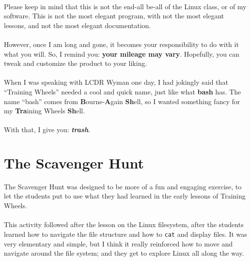 \documentclass[11pt]{article}
\begin{document}
	\paragraph{} Please keep in mind that this is not the end-all be-all of the Linux class, or of my software. This is not the most elegant program, with not the most elegant lessons, and not the most elegant documentation.

	\paragraph{} However, once I am long and gone, it becomes your responsibility to do with it what you will. So, I remind you: \textbf{your mileage may vary}. Hopefully, you can tweak and customize the product to your liking.

	\paragraph{} When I was speaking with LCDR Wyman one day, I had jokingly said that ``Training Wheels'' needed a cool and quick name, just like what \textbf{bash} has. The name ``bash'' comes from \textbf{B}ourne-\textbf{A}gain \textbf{Sh}ell, so I wanted something fancy for my \textbf{Tra}ining Wheels \textbf{Sh}ell. 

	\paragraph{} With that, I give you:  \textbf{\textit{trash}}.

	\newpage


	\section{The Scavenger Hunt}

	\paragraph{} The Scavenger Hunt was designed to be more of a fun and engaging exercise, to let the students put to use what they had learned in the early lessons of Training Wheels.

	\paragraph{} This activity followed after the lesson on the Linux filesystem, after the students learned how to navigate the file structure and how to \texttt{cat} and display files. It was very elementary and simple, but I think it really reinforced how to move and navigate around the file system; and they get to explore Linux all along the way.
\end{document}
